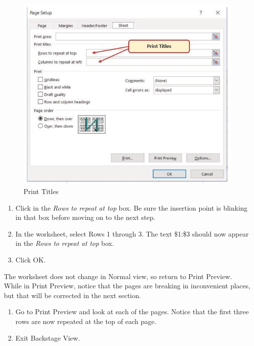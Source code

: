\begin{figure}[H]
	\centering
	\includegraphics[width=\maxwidth{.95\linewidth}]{gfx/ch03_fig29}
	\caption{Print Titles}
	\label{03:fig29}
\end{figure}

\begin{enumerate}[resume]
	\item Click in the \textit{Rows to repeat at top} box. Be sure the insertion point is blinking in that box before moving on to the next step.
	\item In the worksheet, select Rows 1 through 3. The text \$1:\$3 should now appear in the \textit{Rows to repeat at top} box.
	\item Click OK.
\end{enumerate}

The worksheet does not change in Normal view, so return to Print Preview. While in Print Preview, notice that the pages are breaking in inconvenient places, but that will be corrected in the next section.

\begin{enumerate}
	\item Go to Print Preview and look at each of the pages. Notice that the first three rows are now repeated at the top of each page.
	\item Exit Backstage View.
\end{enumerate}

